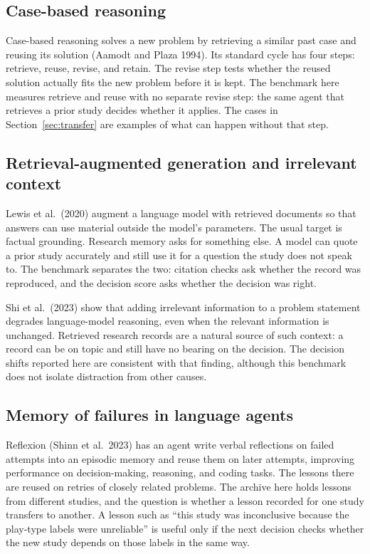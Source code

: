 \documentclass[11pt]{article}
\begin{document}
\subsection{Case-based reasoning}

Case-based reasoning solves a new problem by retrieving a similar past case and reusing its solution (Aamodt and Plaza 1994). Its standard cycle has four steps: retrieve, reuse, revise, and retain. The revise step tests whether the reused solution actually fits the new problem before it is kept. The benchmark here measures retrieve and reuse with no separate revise step: the same agent that retrieves a prior study decides whether it applies. The cases in Section~\ref{sec:transfer} are examples of what can happen without that step.

\subsection{Retrieval-augmented generation and irrelevant context}

Lewis et al.\ (2020) augment a language model with retrieved documents so that answers can use material outside the model's parameters. The usual target is factual grounding. Research memory asks for something else. A model can quote a prior study accurately and still use it for a question the study does not speak to. The benchmark separates the two: citation checks ask whether the record was reproduced, and the decision score asks whether the decision was right.

Shi et al.\ (2023) show that adding irrelevant information to a problem statement degrades language-model reasoning, even when the relevant information is unchanged. Retrieved research records are a natural source of such context: a record can be on topic and still have no bearing on the decision. The decision shifts reported here are consistent with that finding, although this benchmark does not isolate distraction from other causes.

\subsection{Memory of failures in language agents}

Reflexion (Shinn et al.\ 2023) has an agent write verbal reflections on failed attempts into an episodic memory and reuse them on later attempts, improving performance on decision-making, reasoning, and coding tasks. The lessons there are reused on retries of closely related problems. The archive here holds lessons from different studies, and the question is whether a lesson recorded for one study transfers to another. A lesson such as ``this study was inconclusive because the play-type labels were unreliable'' is useful only if the next decision checks whether the new study depends on those labels in the same way.
\end{document}
